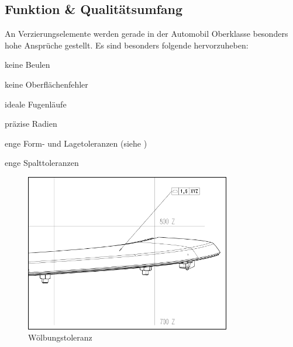 \documentclass[12pt,a4paper,parskip]{scrartcl}
\begin{document}
	 	 
\subsection{Funktion \& Qualitätsumfang}
An Verzierungselemente werden gerade in der Automobil Oberklasse besonders hohe Ansprüche gestellt. Es sind besonders folgende hervorzuheben:
\begin{itemize*}
\item keine Beulen
\item keine Oberflächenfehler
\item ideale Fugenläufe
\item präzise Radien
\item enge Form- und Lagetoleranzen (siehe )
\item enge Spalttoleranzen
\end{itemize*}
\begin{figure}[hbtp]
  \centering
  \includegraphics[width=0.8\textwidth]{vdkdtol}
  \caption{Wölbungstoleranz}
  \label{fig:vdkdtol}
  \end{figure}
  
\end{document}
